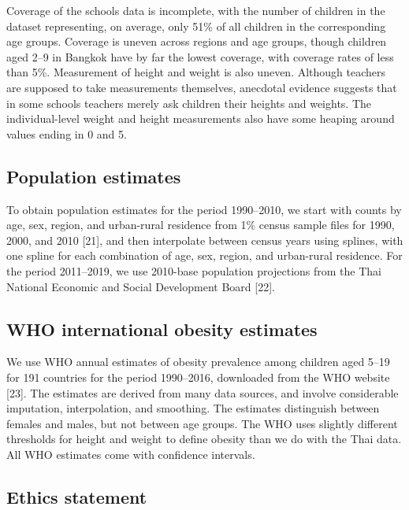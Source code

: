 \documentclass[10pt,letterpaper]{article}
\begin{document}
Coverage of the schools data is incomplete, with the number of children
in the dataset representing, on average, only 51\% of all children in
the corresponding age groups. Coverage is uneven across regions and age
groups, though children aged 2--9 in Bangkok have by far the lowest
coverage, with coverage rates of less than 5\%. Measurement of height
and weight is also uneven. Although teachers are supposed to take
measurements themselves, anecdotal evidence suggests that in some
schools teachers merely ask children their heights and weights. The
individual-level weight and height measurements also have some heaping
around values ending in 0 and 5.

\hypertarget{population-estimates}{%
\subsection{Population estimates}\label{population-estimates}}

To obtain population estimates for the period 1990--2010, we start with
counts by age, sex, region, and urban-rural residence from 1\% census
sample files for 1990, 2000, and 2010 {[}21{]}, and then interpolate
between census years using splines, with one spline for each combination
of age, sex, region, and urban-rural residence. For the period
2011--2019, we use 2010-base population projections from the Thai
National Economic and Social Development Board {[}22{]}.

\hypertarget{who-international-obesity-estimates}{%
\subsection{WHO international obesity
estimates}\label{who-international-obesity-estimates}}

We use WHO annual estimates of obesity prevalence among children aged
5--19 for 191 countries for the period 1990--2016, downloaded from the
WHO website {[}23{]}. The estimates are derived from many data sources,
and involve considerable imputation, interpolation, and smoothing. The
estimates distinguish between females and males, but not between age
groups. The WHO uses slightly different thresholds for height and weight
to define obesity than we do with the Thai data. All WHO estimates come
with confidence intervals.

\hypertarget{ethics-statement}{%
\subsection{Ethics statement}\label{ethics-statement}}
\end{document}
